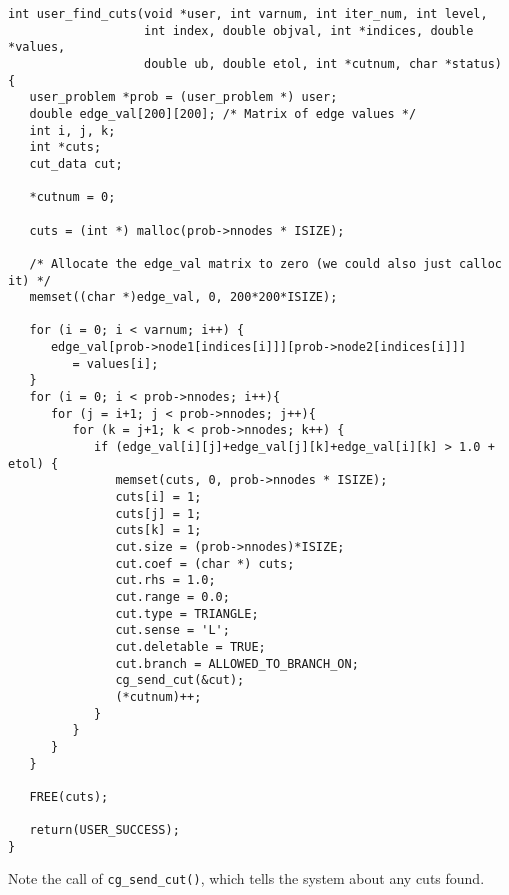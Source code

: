 \documentclass[11pt]{article}
\begin{document}
\begin{verbatim}
int user_find_cuts(void *user, int varnum, int iter_num, int level,
                   int index, double objval, int *indices, double *values,
                   double ub, double etol, int *cutnum, char *status)
{
   user_problem *prob = (user_problem *) user;
   double edge_val[200][200]; /* Matrix of edge values */
   int i, j, k;
   int *cuts;
   cut_data cut;
   
   *cutnum = 0;

   cuts = (int *) malloc(prob->nnodes * ISIZE);

   /* Allocate the edge_val matrix to zero (we could also just calloc it) */
   memset((char *)edge_val, 0, 200*200*ISIZE);
   
   for (i = 0; i < varnum; i++) {
      edge_val[prob->node1[indices[i]]][prob->node2[indices[i]]] 
         = values[i];
   }
   for (i = 0; i < prob->nnodes; i++){
      for (j = i+1; j < prob->nnodes; j++){
         for (k = j+1; k < prob->nnodes; k++) {
            if (edge_val[i][j]+edge_val[j][k]+edge_val[i][k] > 1.0 + etol) {
               memset(cuts, 0, prob->nnodes * ISIZE);
               cuts[i] = 1; 
               cuts[j] = 1;
               cuts[k] = 1;
               cut.size = (prob->nnodes)*ISIZE;
               cut.coef = (char *) cuts;
               cut.rhs = 1.0;
               cut.range = 0.0;
               cut.type = TRIANGLE;
               cut.sense = 'L';
               cut.deletable = TRUE;
               cut.branch = ALLOWED_TO_BRANCH_ON;
               cg_send_cut(&cut);
               (*cutnum)++;
            }
         }
      }
   }
   
   FREE(cuts);

   return(USER_SUCCESS);
}
\end{verbatim}

Note the call of \texttt{cg\_send\_cut()}, which tells the system about any
cuts found.
\end{document}
